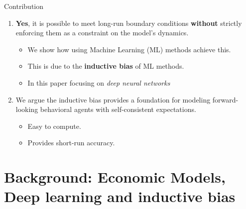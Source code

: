 \documentclass[aspectratio=169,10pt]{beamer}
\newcommand{\emphcolor}[1]{\textbf{\textcolor{emphcolorval}{#1}}}
\begin{document}
\begin{frame}{Contribution}
	
\begin{enumerate}
	\item \emphcolor{Yes}, it is possible to meet
	long-run boundary conditions \emphcolor{without} strictly enforcing them as a constraint on the model’s dynamics.
	\vspace{0.05in}
	\begin{itemize}
		\item We show how using Machine Learning (ML) methods achieve this.
		\vspace{0.025in}
		\item This is due to the \emphcolor{inductive bias} of ML methods.
		\vspace{0.025in} 
		\item In this paper focusing on \emph{deep neural networks}
		\vspace{0.025in} 
	\end{itemize} 
	\item We argue the inductive bias provides a foundation for modeling forward-looking behavioral
	agents with self-consistent expectations.
	\vspace{0.025in}
	\begin{itemize}
		\item Easy to compute. 
		\vspace{0.025in}
		\item Provides short-run accuracy.
		\vspace{0.025in}
	\end{itemize}
\end{enumerate}

\end{frame}

\section{\textcolor{KahouBlack}{Background: Economic Models, Deep learning and inductive bias}}
\end{document}
